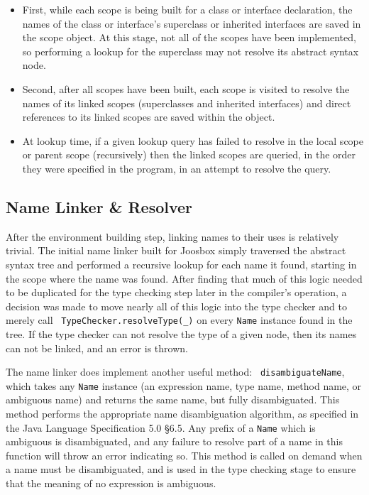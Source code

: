 \documentclass[letterpaper]{article}
\begin{document}
  \begin{itemize}
    \item First, while each scope is being built for a class or interface
    declaration, the names of the class or interface's superclass or inherited
    interfaces are saved in the scope object. At this stage, not all of the
    scopes have been implemented, so performing a lookup for the superclass
    may not resolve its abstract syntax node.

    \item Second, after all scopes have been built, each scope is visited to
    resolve the names of its linked scopes (superclasses and inherited interfaces)
    and direct references to its linked scopes are saved within the object.

    \item At lookup time, if a given lookup query has failed to resolve in
    the local scope or parent scope (recursively) then the linked scopes are
    queried, in the order they were specified in the program, in an attempt
    to resolve the query.
  \end{itemize}

  \subsection{Name Linker \& Resolver}

  After the environment building step, linking names to their uses is
  relatively trivial. The initial name linker built for Joosbox simply
  traversed the abstract syntax tree and performed a recursive lookup for each
  name it found, starting in the scope where the name was found. After finding
  that much of this logic needed to be duplicated for the type checking step
  later in the compiler's operation, a decision was made to move nearly all of
  this logic into the type checker and to merely call {\tt
  TypeChecker.resolveType(\_)} on every {\tt Name} instance found in the tree.
  If the type checker can not resolve the type of a given node, then its names
  can not be linked, and an error is thrown.

  The name linker does implement another useful method: {\tt
  disambiguateName}, which takes any {\tt Name} instance (an expression name,
  type name, method name, or ambiguous name) and returns the same name, but
  fully disambiguated. This method performs the appropriate name
  disambiguation algorithm, as specified in the Java Language Specification
  5.0 \S 6.5. Any prefix of a {\tt Name} which is ambiguous is disambiguated,
  and any failure to resolve part of a name in this function will throw an
  error indicating so. This method is called on demand when a name must be
  disambiguated, and is used in the type checking stage to ensure that the
  meaning of no expression is ambiguous.
\end{document}
